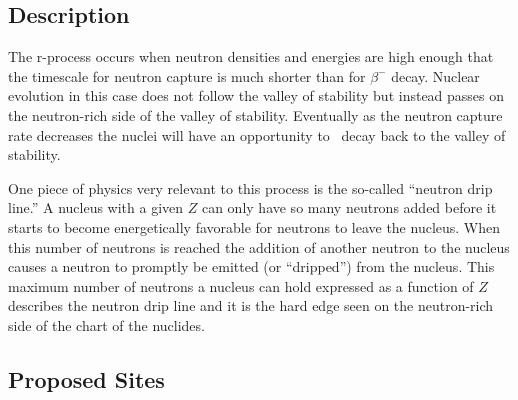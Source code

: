 \label{sec:r}
\subsection{Description}

The r-process occurs when neutron
densities and energies are high enough that the timescale for
neutron capture is much shorter than for $\beta^-$ decay.  Nuclear
evolution in this case does not follow the valley of stability but
instead passes on the neutron-rich side of the valley of stability.
Eventually as the neutron capture rate decreases the nuclei will have
an opportunity to \bminus\ decay back to the valley of stability.

One piece of physics very relevant to this process is the so-called
``neutron drip line.''  A nucleus with a given $Z$ can only have so
many neutrons added before it starts to become energetically favorable
for neutrons to leave the nucleus.  When this number of neutrons is
reached the addition of another neutron to the nucleus causes a
neutron to promptly be emitted (or ``dripped'') from the nucleus.
This maximum number of neutrons a nucleus can hold expressed as a
function of $Z$ describes the neutron drip line and it is the hard
edge seen on the neutron-rich side of the chart of the nuclides.


\subsection{Proposed Sites}